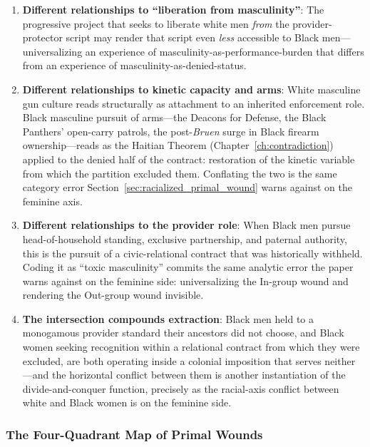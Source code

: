 \begin{enumerate}
    \item \textbf{Different relationships to ``liberation from masculinity''}: The progressive project that seeks to liberate white men \textit{from} the provider-protector script may render that script even \textit{less} accessible to Black men---universalizing an experience of masculinity-as-performance-burden that differs from an experience of masculinity-as-denied-status.
    
    \item \textbf{Different relationships to kinetic capacity and arms}: White masculine gun culture reads structurally as attachment to an inherited enforcement role. Black masculine pursuit of arms---the Deacons for Defense, the Black Panthers' open-carry patrols, the post-\textit{Bruen} surge in Black firearm ownership---reads as the Haitian Theorem (Chapter~\ref{ch:contradiction}) applied to the denied half of the contract: restoration of the kinetic variable from which the partition excluded them. Conflating the two is the same category error Section~\ref{sec:racialized_primal_wound} warns against on the feminine axis.
    
    \item \textbf{Different relationships to the provider role}: When Black men pursue head-of-household standing, exclusive partnership, and paternal authority, this is the pursuit of a civic-relational contract that was historically withheld. Coding it as ``toxic masculinity'' commits the same analytic error the paper warns against on the feminine side: universalizing the In-group wound and rendering the Out-group wound invisible.
    
    \item \textbf{The intersection compounds extraction}: Black men held to a monogamous provider standard their ancestors did not choose, and Black women seeking recognition within a relational contract from which they were excluded, are both operating inside a colonial imposition that serves neither---and the horizontal conflict between them is another instantiation of the divide-and-conquer function, precisely as the racial-axis conflict between white and Black women is on the feminine side.
\end{enumerate}

\subsubsection*{The Four-Quadrant Map of Primal Wounds}

